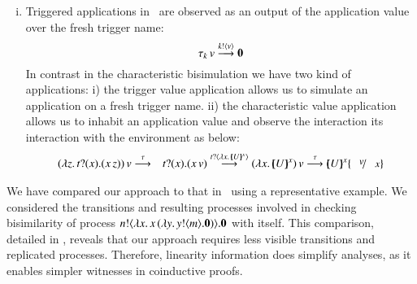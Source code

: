 \begin{enumerate}[i)]
	\item 	Triggered applications in~\cite{JeffreyR05}
		are observed as an output of the application
		value over the fresh trigger name:
		\[
			\tau_k\,v \stackrel{k ! \langle v \rangle}{\longrightarrow} \mathbf{0}
		\]
		In contrast in the characteristic bisimulation
		we have two kind of applications:
		i) the trigger value application allows us
		to simulate an application on a fresh trigger name.
		ii) the characteristic value application
		allows us to inhabit an application value 
		and observe the interaction its interaction
		with the environment as below: 
		\begin{eqnarray*}
			\appl{(\abs{z}{\binp{t}{x} (\appl{x}{z})})}{v} &\by{\tau}& \binp{t}{x} (\appl{x}{v})
			\by{\bactinp{t}{\abs{x}{\mapchar{U}{x}}}}
			\appl{(\abs{x}{\mapchar{U}{x}})}{v}
			\by{\tau} \mapchar{U}{x} \subst{v}{x}
		\end{eqnarray*}
\end{enumerate}

\noi We have compared our approach to that in~\cite{JeffreyR05} 
using a representative example.
We considered the transitions and resulting processes involved in checking bisimilarity of process 
$n ! \langle \lambda x.\,x\,(\lambda y.\,y ! \langle m \rangle . \mathbf{0}) \rangle . \mathbf{0}$
with itself.
This comparison, detailed in , reveals that our approach 
requires less visible transitions and replicated processes. 
Therefore, linearity information does simplify analyses, 
as it enables simpler witnesses in  coinductive proofs.




